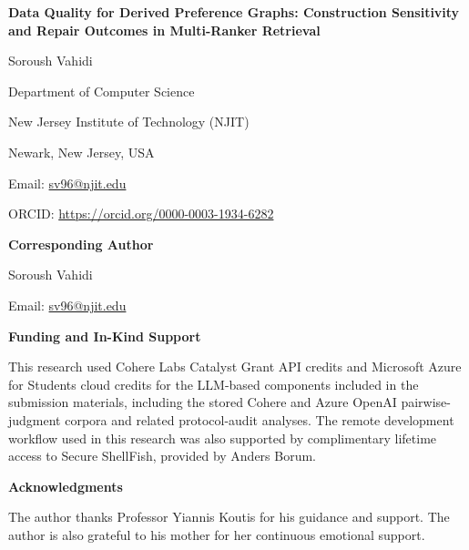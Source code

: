 \documentclass[12pt]{article}
\begin{document}
\begin{center}
{\LARGE \bfseries Data Quality for Derived Preference Graphs: Construction Sensitivity and Repair Outcomes in Multi-Ranker Retrieval\par}
\vspace{1.5em}
{\large Soroush Vahidi\par}
\vspace{0.75em}
Department of Computer Science\par
New Jersey Institute of Technology (NJIT)\par
Newark, New Jersey, USA\par
\vspace{0.75em}
Email: \href{mailto:sv96@njit.edu}{sv96@njit.edu}\par
ORCID: \url{https://orcid.org/0000-0003-1934-6282}\par
\end{center}

\vspace{1.25em}

{\bfseries Corresponding Author}\par
Soroush Vahidi\par
Email: \href{mailto:sv96@njit.edu}{sv96@njit.edu}

\vspace{1em}

{\bfseries Funding and In-Kind Support}\par
This research used Cohere Labs Catalyst Grant API credits and Microsoft Azure
for Students cloud credits for the LLM-based components included in the
submission materials, including the stored Cohere and Azure OpenAI
pairwise-judgment corpora and related protocol-audit analyses. The remote
development workflow used in this research was also supported by
complimentary lifetime access to Secure ShellFish, provided by Anders Borum.

\vspace{1em}

{\bfseries Acknowledgments}\par
The author thanks Professor Yiannis Koutis for his guidance and support. The
author is also grateful to his mother for her continuous emotional support.
\end{document}
